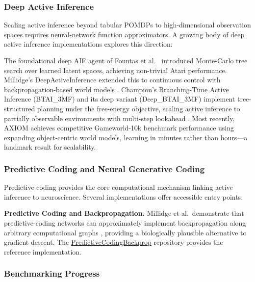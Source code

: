 \documentclass[
  english,
]{article}
\begin{document}
\subsubsection{Deep Active Inference}\label{deep-active-inference}

Scaling active inference beyond tabular POMDPs to high-dimensional
observation spaces requires neural-network function approximators. A
growing body of deep active inference implementations explores this
direction:

The foundational deep AIF agent of Fountas et
al.~\citep{fountas2020deep} introduced Monte-Carlo tree search over
learned latent spaces, achieving non-trivial Atari performance.
Millidge's DeepActiveInference extended this to continuous control with
backpropagation-based world models \citep{millidge2020deep}. Champion's
Branching-Time Active Inference (BTAI\_3MF) and its deep variant
(Deep\_BTAI\_3MF) implement tree-structured planning under the
free-energy objective, scaling active inference to partially observable
environments with multi-step lookahead \citep{champion2021realizing}.
Most recently, AXIOM \citep{heins2025axiom} achieves competitive
Gameworld-10k benchmark performance using expanding object-centric world
models, learning in minutes rather than hours---a landmark result for
scalability.

\subsubsection{Predictive Coding and Neural Generative
Coding}\label{predictive-coding-and-neural-generative-coding}

Predictive coding provides the core computational mechanism linking
active inference to neuroscience. Several implementations offer
accessible entry points:

\textbf{Predictive Coding and Backpropagation.} Millidge et
al.~demonstrate that predictive-coding networks can approximately
implement backpropagation along arbitrary computational graphs
\citep{millidge2022predictive}, providing a biologically plausible
alternative to gradient descent. The
\href{https://github.com/BerenMillidge/PredictiveCodingBackprop}{PredictiveCodingBackprop}
repository provides the reference implementation.

\subsubsection{Benchmarking Progress}\label{benchmarking-progress}
\end{document}
